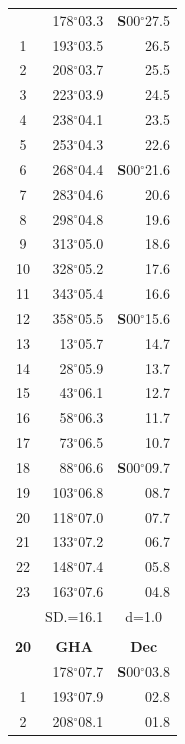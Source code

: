 \documentclass[10pt, a4paper]{report}
\begin{document}
\begin{scriptsize}
\begin{tabular*}{0.2\textwidth}[t]{@{\extracolsep{\fill}}|c|rr|}
\hline\rule{0pt}{2.6ex}\noindent
0 & 178$^\circ$03.3 & \textbf{S}00$^\circ$27.5\\
1 & 193$^\circ$03.5 & 26.5\\
2 & 208$^\circ$03.7 & 25.5\\
3 & 223$^\circ$03.9 & \raisebox{0.24ex}{\boldmath$\cdot$~\boldmath$\cdot$~~}24.5\\
4 & 238$^\circ$04.1 & 23.5\\
5 & 253$^\circ$04.3 & 22.6\\[2Pt]
6 & 268$^\circ$04.4 & \textbf{S}00$^\circ$21.6\\
7 & 283$^\circ$04.6 & 20.6\\
8 & 298$^\circ$04.8 & 19.6\\
9 & 313$^\circ$05.0 & \raisebox{0.24ex}{\boldmath$\cdot$~\boldmath$\cdot$~~}18.6\\
10 & 328$^\circ$05.2 & 17.6\\
11 & 343$^\circ$05.4 & 16.6\\[2Pt]
12 & 358$^\circ$05.5 & \textbf{S}00$^\circ$15.6\\
13 & 13$^\circ$05.7 & 14.7\\
14 & 28$^\circ$05.9 & 13.7\\
15 & 43$^\circ$06.1 & \raisebox{0.24ex}{\boldmath$\cdot$~\boldmath$\cdot$~~}12.7\\
16 & 58$^\circ$06.3 & 11.7\\
17 & 73$^\circ$06.5 & 10.7\\[2Pt]
18 & 88$^\circ$06.6 & \textbf{S}00$^\circ$09.7\\
19 & 103$^\circ$06.8 & 08.7\\
20 & 118$^\circ$07.0 & 07.7\\
21 & 133$^\circ$07.2 & \raisebox{0.24ex}{\boldmath$\cdot$~\boldmath$\cdot$~~}06.7\\
22 & 148$^\circ$07.4 & 05.8\\
23 & 163$^\circ$07.6 & 04.8\\
\hline
\rule{0pt}{2.4ex} & \multicolumn{1}{c}{SD.=16.1} & \multicolumn{1}{c|}{d=1.0}\\
\hline
\multicolumn{1}{c}{}\\[-0.5ex]\hline
\multicolumn{1}{|c|}{\rule{0pt}{2.6ex}\textbf{20}} & \multicolumn{1}{c}{\textbf{GHA}} & \multicolumn{1}{c|}{\textbf{Dec}}\\
\hline\rule{0pt}{2.6ex}\noindent
0 & 178$^\circ$07.7 & \textbf{S}00$^\circ$03.8\\
1 & 193$^\circ$07.9 & 02.8\\
2 & 208$^\circ$08.1 & 01.8\\

\end{tabular*}
\end{scriptsize}
\end{document}
